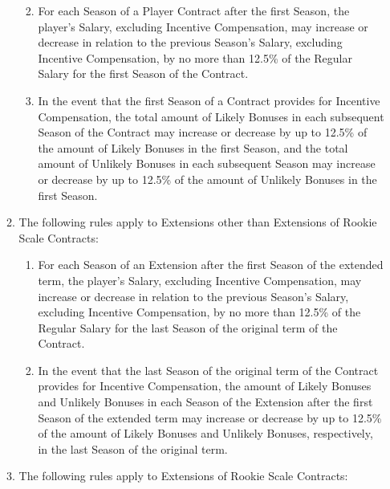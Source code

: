 \documentclass[
]{book}
\providecommand{\tightlist}{%
  \setlength{\itemsep}{0pt}\setlength{\parskip}{0pt}}
\begin{document}
\begin{enumerate}
\begin{enumerate}
    \begin{enumerate}
    \def\labelenumiii{(\roman{enumiii})}
    \tightlist
    \item
      For each Season of a Player Contract after the first Season, the player's Salary, excluding Incentive Compensation, may increase or decrease in relation to the previous Season's Salary, excluding Incentive Compensation, by no more than 12.5\% of the Regular Salary for the first Season of the Contract.
    \item
      In the event that the first Season of a Contract provides for Incentive Compensation, the total amount of Likely Bonuses in each subsequent Season of the Contract may increase or decrease by up to 12.5\% of the amount of Likely Bonuses in the first Season, and the total amount of Unlikely Bonuses in each subsequent Season may increase or decrease by up to 12.5\% of the amount of Unlikely Bonuses in the first Season.
    \end{enumerate}
  \item
    The following rules apply to Extensions other than Extensions of Rookie Scale Contracts:

    \begin{enumerate}
    \def\labelenumiii{(\roman{enumiii})}
    \tightlist
    \item
      For each Season of an Extension after the first Season of the extended term, the player's Salary, excluding Incentive Compensation, may increase or decrease in relation to the previous Season's Salary, excluding Incentive Compensation, by no more than 12.5\% of the Regular Salary for the last Season of the original term of the Contract.
    \item
      In the event that the last Season of the original term of the Contract provides for Incentive Compensation, the amount of Likely Bonuses and Unlikely Bonuses in each Season of the Extension after the first Season of the extended term may increase or decrease by up to 12.5\% of the amount of Likely Bonuses and Unlikely Bonuses, respectively, in the last Season of the original term.
    \end{enumerate}
  \item
    The following rules apply to Extensions of Rookie Scale Contracts:


\end{enumerate}
\end{enumerate}
\end{document}
